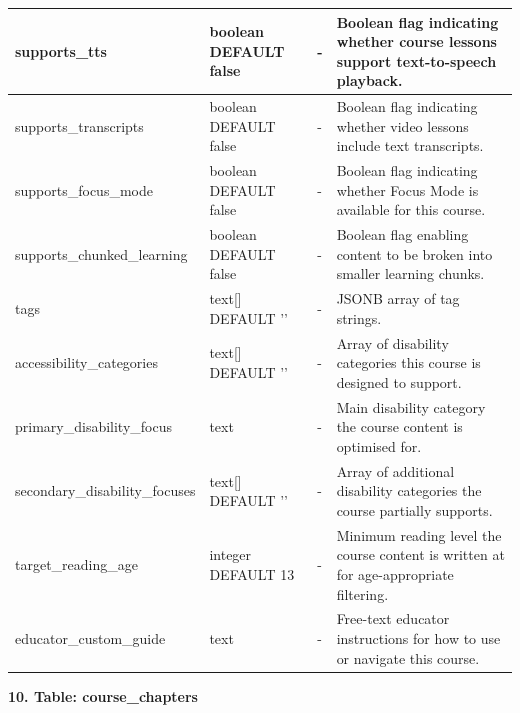 \documentclass[12pt, oneside]{article} %
\newcommand{\tabbreak}{\hyphenpenalty=200\exhyphenpenalty=200\tolerance=4000\hbadness=10000\hspace{0pt}}
\begin{document}
{\begin{longtable}{|>{\raggedright\arraybackslash\tabbreak}p{2.67cm}|>{\raggedright\arraybackslash\tabbreak}p{2.93cm}|>{\raggedright\arraybackslash\tabbreak}p{2.67cm}|>{\raggedright\arraybackslash\tabbreak}p{4.51cm}|}
supports\_tts & boolean DEFAULT false & - & Boolean flag indicating whether course lessons support text-to-speech playback. \\ \hline
supports\_transcripts & boolean DEFAULT false & - & Boolean flag indicating whether video lessons include text transcripts. \\ \hline
supports\_focus\_mode & boolean DEFAULT false & - & Boolean flag indicating whether Focus Mode is available for this course. \\ \hline
supports\_chunked\_learning & boolean DEFAULT false & - & Boolean flag enabling content to be broken into smaller learning chunks. \\ \hline
tags & text[] DEFAULT '{}' & - & JSONB array of tag strings. \\ \hline
accessibility\_categories & text[] DEFAULT '{}' & - & Array of disability categories this course is designed to support. \\ \hline
primary\_disability\_focus & text & - & Main disability category the course content is optimised for. \\ \hline
secondary\_disability\_focuses & text[] DEFAULT '{}' & - & Array of additional disability categories the course partially supports. \\ \hline
target\_reading\_age & integer DEFAULT 13 & - & Minimum reading level the course content is written at for age-appropriate filtering. \\ \hline
educator\_custom\_guide & text & - & Free-text educator instructions for how to use or navigate this course. \\ \hline
\end{longtable}
}

\textbf{10. Table: course\_chapters}
\end{document}
